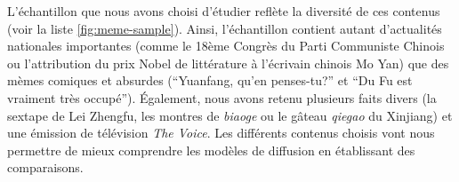 \begin{figure}[htbp]
    \hspace{\fill}
    \hspace{\fill}%
    \hspace{\fill}%
    \caption{}
    \label{}
\end{figure}


L'échantillon que nous avons choisi d'étudier reflète la diversité de ces contenus (voir la liste \ref{fig:meme-sample}). Ainsi, l'échantillon contient autant d'actualités nationales importantes (comme le 18ème Congrès du Parti Communiste Chinois ou l'attribution du prix Nobel de littérature à l'écrivain chinois Mo Yan) que des mèmes comiques et absurdes (``Yuanfang, qu'en penses-tu?'' et ``Du Fu est vraiment très occupé''). Également, nous avons retenu plusieurs faits divers (la sextape de Lei Zhengfu, les montres de \textit{biaoge} ou le gâteau \textit{qiegao} du Xinjiang) et une émission de télévision \textit{The Voice}. Les différents contenus choisis vont nous permettre de mieux comprendre les modèles de diffusion en établissant des comparaisons.


